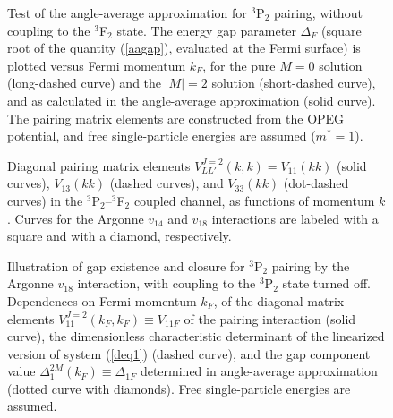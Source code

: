 \newpage 

\begin{figure}
\begin{center}
\end{center}
\caption{
Test of the angle-average approximation for $^3$P$_2$ pairing, without 
coupling to the $^3$F$_2$ state.  The energy gap parameter $\Delta_F$ 
(square root of the quantity (\ref{aagap}), evaluated at the Fermi surface) 
is plotted versus Fermi momentum $k_F$, for the pure $M=0$ solution 
(long-dashed curve) and the $|M|=2$ solution (short-dashed curve), and 
as calculated in the angle-average approximation (solid curve).  The pairing 
matrix elements are constructed from the OPEG potential, and 
free single-particle energies are assumed ($m^*=1$).
}
\label{fig:aaaandm}
\end{figure}

\begin{figure}
\begin{center}
\end{center}
\caption{
Diagonal pairing matrix elements $V_{LL'}^{J=2}(k,k)=V_{11}(kk)$ (solid
curves), $V_{13}(kk)$ (dashed curves), and $V_{33}(kk)$
(dot-dashed curves) in the $^3$P$_2$--$^3$F$_2$ coupled channel, as 
functions of momentum $k$.  Curves for the Argonne $v_{14}$ and $v_{18}$
interactions are labeled with a square and with a diamond, respectively.
}
\label{fig:diagme}
\end{figure}

\begin{figure}
\begin{center}
\end{center}
\caption{
Illustration of gap existence and closure for $^3$P$_2$ pairing
by the Argonne $v_{18}$ interaction, with coupling to the $^3$P$_2$ 
state turned off.  Dependences on Fermi momentum $k_F$, of the diagonal 
matrix elements $V_{11}^{J=2}(k_F,k_F)\equiv V_{11F}$ of the pairing 
interaction (solid curve), the dimensionless characteristic determinant 
of the linearized version of system (\ref{deq1}) (dashed curve), and 
the gap component value $\Delta_1^{2M}(k_F)\equiv\Delta_{1F}$ 
determined in angle-average approximation (dotted curve 
with diamonds).  Free single-particle energies are assumed.
}
\label{fig:3in1}
\end{figure}

